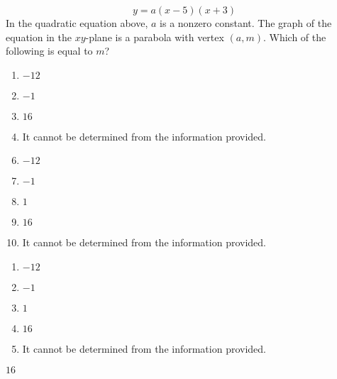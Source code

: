  
$$y=a(x-5)(x+3)$$
In the quadratic equation above, $a$ is a nonzero constant.  The graph of the equation in the $xy$-plane is a parabola with vertex $(a,m)$.  Which of the following is equal to $m$?


\ifsat
	\begin{enumerate}[label=\Alph*)]
		\item $-12 $ 
		\item $-1 $ 
		\item $16 $ %
		\item It cannot be determined from the information provided.
	\end{enumerate}
\else
\fi

\ifacteven
	\begin{enumerate}[label=\textbf{\Alph*.},itemsep=\fill,align=left]
		\setcounter{enumii}{5}
		\item $-12 $ 
		\item $-1 $ 
		\item $1 $ 
		\addtocounter{enumii}{1}
		\item $16 $ %
		\item It cannot be determined from the information provided.
	\end{enumerate}
\else
\fi

\ifactodd
	\begin{enumerate}[label=\textbf{\Alph*.},itemsep=\fill,align=left]
		\item $-12 $ 
		\item $-1 $ 
		\item $1 $ 
		\item $16 $ %
		\item It cannot be determined from the information provided.
	\end{enumerate}
\else
\fi

\ifgridin
 $16 $ %
		
\else
\fi


